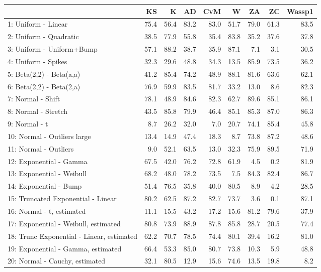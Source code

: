 \documentclass[
]{article}
\begin{document}
\begin{table}[H]
\centering\begingroup\fontsize{15}{17}\selectfont

\begin{tabular}{l|r|r|r|r|r|r|r|r}
\hline
  & KS & K & AD & CvM & W & ZA & ZC & Wassp1\\
\hline
1: Uniform - Linear & 75.4 & 56.4 & 83.2 & 83.0 & 51.7 & 79.0 & 61.3 & 83.5\\
\hline
2: Uniform - Quadratic & 38.5 & 77.9 & 55.8 & 35.4 & 83.8 & 35.2 & 37.6 & 37.8\\
\hline
3: Uniform - Uniform+Bump & 57.1 & 88.2 & 38.7 & 35.9 & 87.1 & 7.1 & 3.1 & 30.5\\
\hline
4: Uniform - Spikes & 32.3 & 29.6 & 48.8 & 34.3 & 13.5 & 85.9 & 73.5 & 36.2\\
\hline
5: Beta(2,2) - Beta(a,a) & 41.2 & 85.4 & 74.2 & 48.9 & 88.1 & 81.6 & 63.6 & 62.1\\
\hline
6: Beta(2,2) - Beta(2,a) & 76.9 & 59.9 & 83.5 & 81.7 & 33.2 & 13.0 & 8.6 & 82.3\\
\hline
7: Normal - Shift & 78.1 & 48.9 & 84.6 & 82.3 & 62.7 & 89.6 & 85.1 & 86.1\\
\hline
8: Normal  - Stretch & 43.5 & 85.8 & 79.9 & 46.4 & 85.1 & 85.3 & 87.0 & 86.3\\
\hline
9: Normal  - t & 8.7 & 26.2 & 32.0 & 7.0 & 20.7 & 74.1 & 85.4 & 45.8\\
\hline
10: Normal  - Outliers large & 13.4 & 14.9 & 47.4 & 18.3 & 8.7 & 73.8 & 87.2 & 48.6\\
\hline
11: Normal  - Outliers & 9.0 & 52.1 & 63.5 & 13.0 & 32.3 & 75.9 & 89.5 & 71.9\\
\hline
12: Exponential - Gamma & 67.5 & 42.0 & 76.2 & 72.8 & 61.9 & 4.5 & 0.2 & 81.9\\
\hline
13: Exponential - Weibull & 68.2 & 48.0 & 78.2 & 73.5 & 7.5 & 84.3 & 82.4 & 86.7\\
\hline
14: Exponential - Bump & 51.4 & 76.5 & 35.8 & 40.0 & 80.5 & 8.9 & 4.2 & 28.5\\
\hline
15: Truncated Exponential - Linear & 80.2 & 62.5 & 87.2 & 82.7 & 73.7 & 3.6 & 0.1 & 87.1\\
\hline
16: Normal  - t, estimated & 11.1 & 15.5 & 43.2 & 17.2 & 15.6 & 81.2 & 79.6 & 37.9\\
\hline
17: Exponential - Weibull, estimated & 80.8 & 73.9 & 88.9 & 87.8 & 85.8 & 28.7 & 20.5 & 77.4\\
\hline
18: Trunc Exponential - Linear, estimated & 62.2 & 70.7 & 78.5 & 74.4 & 80.1 & 39.4 & 16.2 & 81.0\\
\hline
19: Exponential - Gamma, estimated & 66.4 & 53.3 & 85.0 & 80.7 & 73.8 & 10.3 & 5.9 & 48.8\\
\hline
20: Normal - Cauchy, estimated & 32.1 & 80.5 & 12.9 & 15.6 & 74.6 & 13.5 & 19.8 & 8.2\\
\hline
\end{tabular}
\endgroup{}
\end{table}
\end{document}
